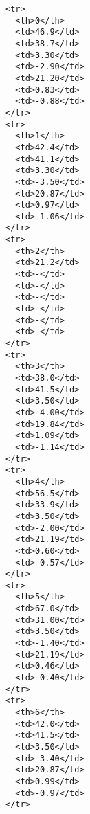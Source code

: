 \begin{verbatim}
<tr>
  <th>0</th>
  <td>46.9</td>
  <td>38.7</td>
  <td>3.30</td>
  <td>-2.90</td>
  <td>21.20</td>
  <td>0.83</td>
  <td>-0.88</td>
</tr>
<tr>
  <th>1</th>
  <td>42.4</td>
  <td>41.1</td>
  <td>3.30</td>
  <td>-3.50</td>
  <td>20.87</td>
  <td>0.97</td>
  <td>-1.06</td>
</tr>
<tr>
  <th>2</th>
  <td>21.2</td>
  <td>-</td>
  <td>-</td>
  <td>-</td>
  <td>-</td>
  <td>-</td>
  <td>-</td>
</tr>
<tr>
  <th>3</th>
  <td>38.0</td>
  <td>41.5</td>
  <td>3.50</td>
  <td>-4.00</td>
  <td>19.84</td>
  <td>1.09</td>
  <td>-1.14</td>
</tr>
<tr>
  <th>4</th>
  <td>56.5</td>
  <td>33.9</td>
  <td>3.50</td>
  <td>-2.00</td>
  <td>21.19</td>
  <td>0.60</td>
  <td>-0.57</td>
</tr>
<tr>
  <th>5</th>
  <td>67.0</td>
  <td>31.00</td>
  <td>3.50</td>
  <td>-1.40</td>
  <td>21.19</td>
  <td>0.46</td>
  <td>-0.40</td>
</tr>
<tr>
  <th>6</th>
  <td>42.0</td>
  <td>41.5</td>
  <td>3.50</td>
  <td>-3.40</td>
  <td>20.87</td>
  <td>0.99</td>
  <td>-0.97</td>
</tr>
\end{verbatim}

\begin{Shaded}
\begin{Highlighting}[]

\end{Highlighting}
\end{Shaded}

\begin{Shaded}
\begin{Highlighting}[]

\end{Highlighting}
\end{Shaded}

